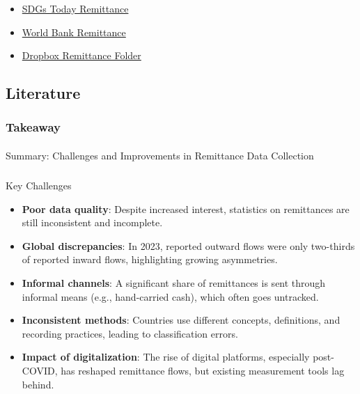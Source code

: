 \documentclass[
  11pt,
]{article}
\makeatletter
\let\oldparagraph\paragraph
\renewcommand{\paragraph}{
    \@ifstar
      \xxxParagraphStar
      \xxxParagraphNoStar
  }
\newcommand{\xxxParagraphStar}[1]{\oldparagraph*{#1}\mbox{}}
\newcommand{\xxxParagraphNoStar}[1]{\oldparagraph{#1}\mbox{}}
\let\oldsubparagraph\subparagraph
\renewcommand{\subparagraph}{
    \@ifstar
      \xxxSubParagraphStar
      \xxxSubParagraphNoStar
  }
\newcommand{\xxxSubParagraphStar}[1]{\oldsubparagraph*{#1}\mbox{}}
\newcommand{\xxxSubParagraphNoStar}[1]{\oldsubparagraph{#1}\mbox{}}
\providecommand{\tightlist}{%
  \setlength{\itemsep}{0pt}\setlength{\parskip}{0pt}}
\makeatother
\begin{document}
\begin{itemize}
\tightlist
\item
  \href{https://sdgstoday.org/dataset/remittances?}{SDGs Today
  Remittance}
\item
  \href{https://databank.worldbank.org/metadataglossary/world-development-indicators/series/BM.TRF.PWKR.CD.DT?}{World
  Bank Remittance}
\item
  \href{https://www.dropbox.com/home/remittance}{Dropbox Remittance
  Folder}
\end{itemize}

\subsection{Literature}\label{literature}

\subsubsection{Takeaway}\label{takeaway}

\paragraph{Summary: Challenges and Improvements in Remittance Data
Collection}\label{summary-challenges-and-improvements-in-remittance-data-collection}

\subparagraph{Key Challenges}\label{key-challenges}

\begin{itemize}
\tightlist
\item
  \textbf{Poor data quality}: Despite increased interest, statistics on
  remittances are still inconsistent and incomplete.
\item
  \textbf{Global discrepancies}: In 2023, reported outward flows were
  only two-thirds of reported inward flows, highlighting growing
  asymmetries.
\item
  \textbf{Informal channels}: A significant share of remittances is sent
  through informal means (e.g., hand-carried cash), which often goes
  untracked.
\item
  \textbf{Inconsistent methods}: Countries use different concepts,
  definitions, and recording practices, leading to classification
  errors.
\item
  \textbf{Impact of digitalization}: The rise of digital platforms,
  especially post-COVID, has reshaped remittance flows, but existing
  measurement tools lag behind.
\end{itemize}
\end{document}
